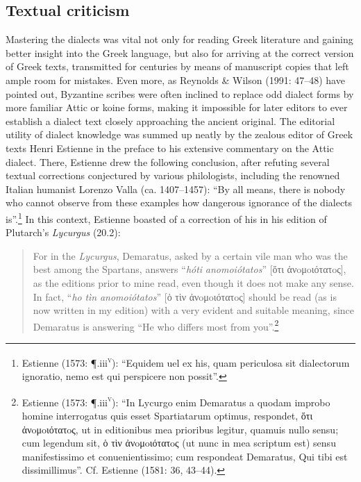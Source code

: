 \subsection{Textual criticism}

Mastering the dialects was vital not only for reading Greek literature and gaining better insight into the Greek language, but also for arriving at the correct version of Greek texts, transmitted for centuries by means of manuscript copies that left ample room for mistakes. Even more, as Reynolds \& Wilson (1991: 47–48) have pointed out, Byzantine scribes were often inclined to replace odd dialect forms by more familiar Attic or koine forms, making it impossible for later editors to ever establish a dialect text closely approaching the ancient original. The editorial utility of dialect knowledge was summed up neatly by the zealous editor of Greek texts Henri Estienne in the preface to his extensive commentary on the Attic dialect. There, Estienne drew the following conclusion, after refuting several textual corrections conjectured by various philologists, including the renowned Italian humanist Lorenzo Valla (ca. 1407–1457): “By all means, there is nobody who cannot observe from these examples how dangerous ignorance of the dialects is”.\footnote{Estienne (1573: ¶.iii\textsc{\textsuperscript{v}}): “Equidem uel ex his, quam periculosa sit dialectorum ignoratio, nemo est qui perspicere non possit”.} In this context, Estienne boasted of a correction of his in his edition of Plutarch’s \textit{Lycurgus} (20.2):

\begin{quote}
For in the \textit{Lycurgus}, Demaratus, asked by a certain vile man who was the best among the Spartans, answers “\textit{hóti} \textit{anomoiótatos}” [ὅτι ἀνoμoιότατoς], as the editions prior to mine read, even though it does not make any sense. In fact, “\textit{ho} \textit{tìn} \textit{anomoiótatos}” [ὁ τὶν ἀνoμoιότατoς] should be read (as is now written in my edition) with a very evident and suitable meaning, since Demaratus is answering “He who differs most from you”.\footnote{Estienne (1573: ¶.iii\textsc{\textsuperscript{v}}): “In Lycurgo enim Demaratus a quodam improbo homine interrogatus quis esset Spartiatarum optimus, respondet, ὅτι ἀνoμoιότατoς, ut in editionibus mea prioribus legitur, quamuis nullo sensu; cum legendum sit, ὁ τὶν ἀνoμoιότατoς (ut nunc in mea scriptum est) sensu manifestissimo et conuenientissimo; cum respondeat Demaratus, Qui tibi est dissimillimus”. Cf. Estienne (1581: 36, 43–44).}
\end{quote}

